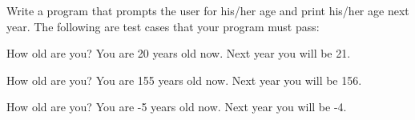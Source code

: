 Write a program that prompts the user for his/her age and print his/her age 
next year. 
The following are test cases that your program must pass:

\resett
\nextt
\begin{console}[commandchars=\\\{\}]
How old are you? 
You are 20 years old now. Next year you will be 21.
\end{console}

\nextt
\begin{console}[commandchars=\\\{\}]
How old are you? 
You are 155 years old now. Next year you will be 156.
\end{console}

\nextt
\begin{console}[commandchars=\\\{\}]
How old are you? 
You are -5 years old now. Next year you will be -4.
\end{console}


